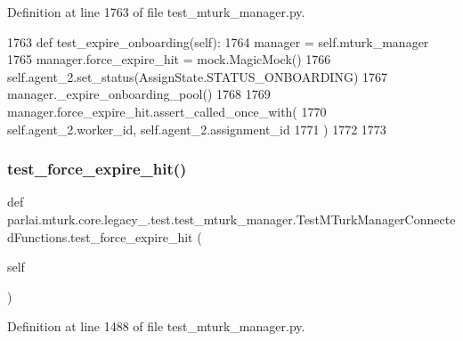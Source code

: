 Definition at line 1763 of file test\+\_\+mturk\+\_\+manager.\+py.


\begin{DoxyCode}
1763     \textcolor{keyword}{def }test\_expire\_onboarding(self):
1764         manager = self.mturk\_manager
1765         manager.force\_expire\_hit = mock.MagicMock()
1766         self.agent\_2.set\_status(AssignState.STATUS\_ONBOARDING)
1767         manager.\_expire\_onboarding\_pool()
1768 
1769         manager.force\_expire\_hit.assert\_called\_once\_with(
1770             self.agent\_2.worker\_id, self.agent\_2.assignment\_id
1771         )
1772 
1773 
\end{DoxyCode}
\mbox{\label{classparlai_1_1mturk_1_1core_1_1legacy__2018_1_1test_1_1test__mturk__manager_1_1TestMTurkManagerConnectedFunctions_acb74d30c65c373a6672565d21fb576b2}} 
\subsubsection{\texorpdfstring{test\+\_\+force\+\_\+expire\+\_\+hit()}{test\_force\_expire\_hit()}}
{\footnotesize\ttfamily def parlai.\+mturk.\+core.\+legacy\+\_.\+test.\+test\+\_\+mturk\+\_\+manager.\+Test\+M\+Turk\+Manager\+Connected\+Functions.\+test\+\_\+force\+\_\+expire\+\_\+hit (\begin{DoxyParamCaption}\item[{}]{self }\end{DoxyParamCaption})}



Definition at line 1488 of file test\+\_\+mturk\+\_\+manager.\+py.


